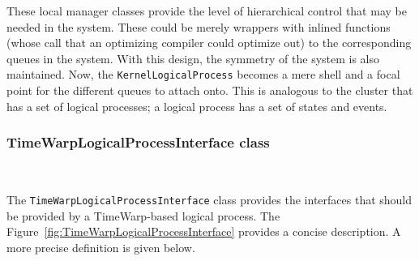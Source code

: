 These local manager classes provide the level of hierarchical control that
may be needed in the system.  These could be merely wrappers with inlined
functions (whose call that an optimizing compiler could optimize out) to
the corresponding queues in the system.  With this design, the symmetry of
the system is also maintained.  Now, the {\tt KernelLogicalProcess}
becomes a mere shell and a focal point for the different queues to attach
onto. This is analogous to the cluster that has a set of logical
processes; a logical process has a set of states and events.

\subsubsection{TimeWarpLogicalProcessInterface class}

\begin{figure*}
\begin{center}
\ 
\end{center}
\caption{The interface a TimeWarp logical process should provide to the
  cluster.}\label{fig:TimeWarpLogicalProcessInterface} 
\end{figure*}

The {\tt TimeWarpLogicalProcessInterface} class provides the interfaces
that should be provided by a TimeWarp-based logical process. The
Figure~\ref{fig:TimeWarpLogicalProcessInterface} provides a concise
description.  A more precise definition is given below.

